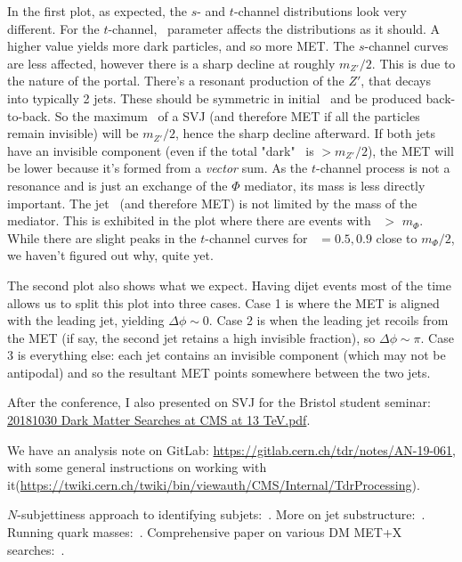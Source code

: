 In the first plot, as expected, the $s$- and $t$-channel distributions look very different. For the $t$-channel, \rinv\ parameter affects the distributions as it should. A higher value yields more dark particles, and so more MET. The $s$-channel curves are less affected, however there is a sharp decline at roughly $m_{Z'}/2$. This is due to the nature of the portal. There's a resonant production of the $Z'$, that decays into typically 2 jets. These should be symmetric in initial \pT\ and be produced back-to-back. So the maximum \pT\ of a SVJ (and therefore MET if all the particles remain invisible) will be $m_{Z'}/2$, hence the sharp decline afterward. If both jets have an invisible component (even if the total "dark" \pT\ is $> m_{Z'}/2$), the MET will be lower because it's formed from a \emph{vector} sum. As the $t$-channel process is not a resonance and is just an exchange of the $\Phi$ mediator, its mass is less directly important. The jet \pT\ (and therefore MET) is not limited by the mass of the mediator. This is exhibited in the plot where there are events with \ptmiss\ $>$ $m_{\Phi}$. While there are slight peaks in the $t$-channel curves for \rinv\ $= 0.5, 0.9$ close to $m_{\Phi}/2$, we haven't figured out why, quite yet.

The second plot also shows what we expect. Having dijet events most of the time allows us to split this plot into three cases. Case 1 is where the MET is aligned with the leading jet, yielding $\Delta\phi \sim 0$. Case 2 is when the leading jet recoils from the MET (if say, the second jet retains a high invisible fraction), so $\Delta\phi \sim \pi$. Case 3 is everything else: each jet contains an invisible component (which may not be antipodal) and so the resultant MET points somewhere between the two jets.

After the conference, I also presented on SVJ for the Bristol student seminar: \href{run:./sec35/20181030 Dark Matter Searches at CMS at 13 TeV.pdf}{20181030 Dark Matter Searches at CMS at 13 TeV.pdf}.

We have an analysis note on GitLab: \url{https://gitlab.cern.ch/tdr/notes/AN-19-061}, with some general instructions on working with it(\url{https://twiki.cern.ch/twiki/bin/viewauth/CMS/Internal/TdrProcessing}).

$N$-subjettiness approach to identifying subjets:~\cite{Thaler:2010tr}.
More on jet substructure:~\cite{Freytsis:2014hpa}.
Running quark masses:~\cite{Bednyakov:2016onn}.
Comprehensive paper on various DM MET+X searches:~\cite{Aaboud:2019yqu}.
